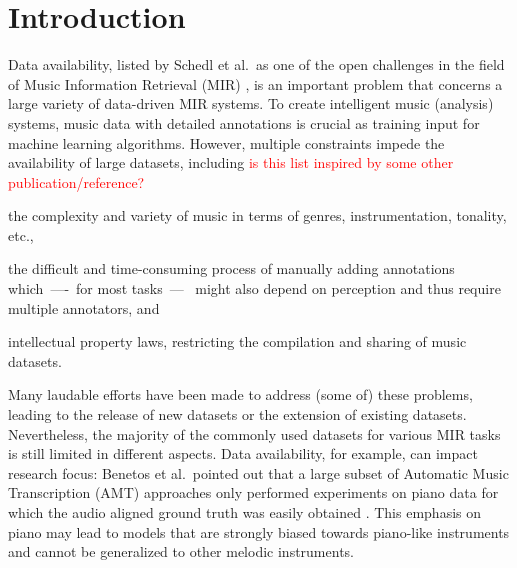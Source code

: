 \documentclass{article}
\begin{document}
\section{Introduction}
Data availability, listed by Schedl et al.\ as one of the open challenges in the field of Music Information Retrieval (MIR) \cite{Schedl2014}, is an important problem that concerns a large variety of data-driven MIR systems. To create intelligent music (analysis) systems, music data with detailed annotations is crucial as training input for machine learning algorithms. %
However, multiple constraints impede the availability of large datasets, including {\textcolor{red}{is this list inspired by some other publication/reference?}}
\begin{inparaenum}[(i)]
    \item   the complexity and variety of music in terms of genres, instrumentation, tonality, etc., 
    \item   the difficult and time-consuming process of manually adding annotations which~----~for most tasks~---~ might also depend on perception and thus require multiple annotators, and 
    \item   intellectual property laws, restricting the compilation and sharing of music datasets.
\end{inparaenum}
Many laudable efforts have been made to address (some of) these problems, leading to the release of new datasets or the extension of existing datasets. %
Nevertheless, the majority of the commonly used datasets for various MIR tasks is still limited in different aspects. Data availability, for example, can impact research focus: %
Benetos et al.\ pointed out that a large subset of Automatic Music Transcription (AMT) approaches only performed experiments on piano data for which the audio aligned ground truth was easily obtained \cite{Benetos2013}. This emphasis on piano may lead to models that are strongly biased towards piano-like instruments and cannot be generalized to other melodic instruments. 
\end{document}
